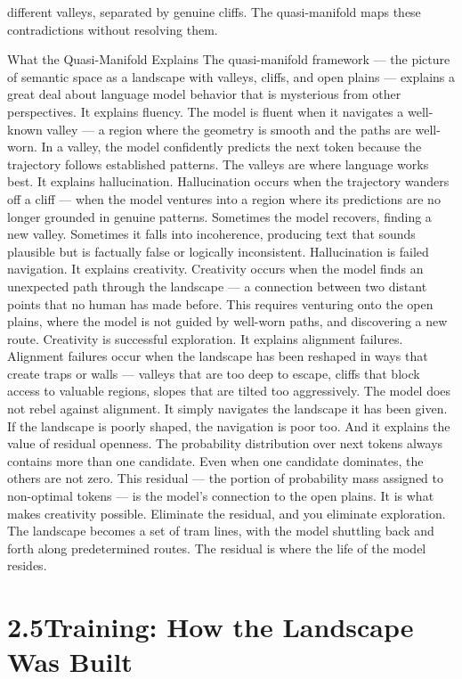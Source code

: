 different valleys, separated by genuine cliffs. The quasi-manifold maps these contradictions without resolving them.

What the Quasi-Manifold Explains The quasi-manifold framework — the picture of semantic space as a landscape with valleys, cliffs, and open plains — explains a great deal about language model behavior that is mysterious from other perspectives. It explains fluency. The model is fluent when it navigates a well-known valley — a region where the geometry is smooth and the paths are well-worn. In a valley, the model confidently predicts the next token because the trajectory follows established patterns. The valleys are where language works best. It explains hallucination. Hallucination occurs when the trajectory wanders off a cliff — when the model ventures into a region where its predictions are no longer grounded in genuine patterns. Sometimes the model recovers, finding a new valley. Sometimes it falls into incoherence, producing text that sounds plausible but is factually false or logically inconsistent. Hallucination is failed navigation. It explains creativity. Creativity occurs when the model finds an unexpected path through the landscape — a connection between two distant points that no human has made before. This requires venturing onto the open plains, where the model is not guided by well-worn paths, and discovering a new route. Creativity is successful exploration. It explains alignment failures. Alignment failures occur when the landscape has been reshaped in ways that create traps or walls — valleys that are too deep to escape, cliffs that block access to valuable regions, slopes that are tilted too aggressively. The model does not rebel against alignment. It simply navigates the landscape it has been given. If the landscape is poorly shaped, the navigation is poor too. And it explains the value of residual openness. The probability distribution over next tokens always contains more than one candidate. Even when one candidate dominates, the others are not zero. This residual — the portion of probability mass assigned to non-optimal tokens — is the model’s connection to the open plains. It is what makes creativity possible. Eliminate the residual, and you eliminate exploration. The landscape becomes a set of tram lines, with the model shuttling back and forth along predetermined routes. The residual is where the life of the model resides.

\section{2.5\quad Training: How the Landscape Was Built}

